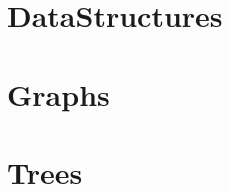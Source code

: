 \documentclass[10pt,a4paper]{article}
\begin{document}








\section*{DataStructures}







\section*{Graphs}










\section*{Trees}


\end{document}
